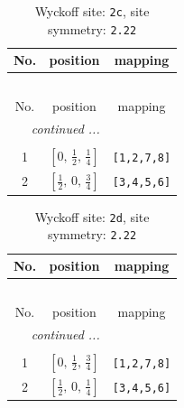\documentclass[fleqn,8pt]{jsarticle}
\begin{document}
\renewcommand{\arraystretch}{1.2}
\begin{longtable}{ccc}
\caption{Wyckoff site: {\tt 2c}, site symmetry: {\tt 2.22}}
 \\
 \hline \hline
No. & position & mapping \\ \hline \endfirsthead

\multicolumn{2}{l}{\tablename\ \thetable{}} \\
 \hline \hline
No. & position & mapping \\ \hline \endhead

 \hline \hline
\multicolumn{2}{r}{\footnotesize\it continued ...} \\ \endfoot

 \hline \hline
\multicolumn{2}{r}{} \\ \endlastfoot

1 & $\left[ 0,\, \frac{1}{2},\, \frac{1}{4} \right]$ & {\tt [1,2,7,8]} \\ \hline
2 & $\left[ \frac{1}{2},\, 0,\, \frac{3}{4} \right]$ & {\tt [3,4,5,6]} \\
\end{longtable}
\renewcommand{\arraystretch}{1.2}
\begin{longtable}{ccc}
\caption{Wyckoff site: {\tt 2d}, site symmetry: {\tt 2.22}}
 \\
 \hline \hline
No. & position & mapping \\ \hline \endfirsthead

\multicolumn{2}{l}{\tablename\ \thetable{}} \\
 \hline \hline
No. & position & mapping \\ \hline \endhead

 \hline \hline
\multicolumn{2}{r}{\footnotesize\it continued ...} \\ \endfoot

 \hline \hline
\multicolumn{2}{r}{} \\ \endlastfoot

1 & $\left[ 0,\, \frac{1}{2},\, \frac{3}{4} \right]$ & {\tt [1,2,7,8]} \\ \hline
2 & $\left[ \frac{1}{2},\, 0,\, \frac{1}{4} \right]$ & {\tt [3,4,5,6]} \\
\end{longtable}
\renewcommand{\arraystretch}{1.2}
\end{document}
